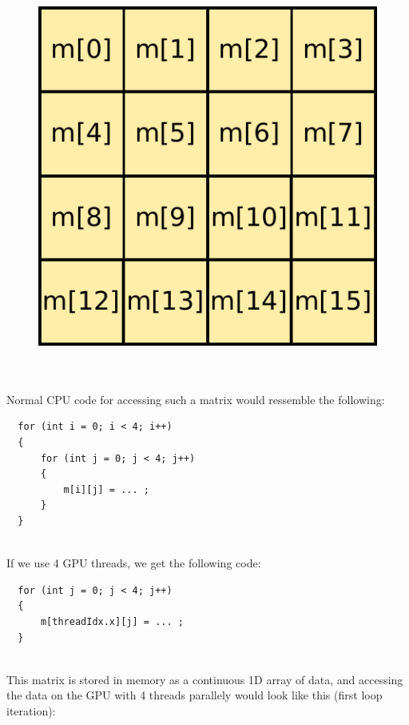 \documentclass[12pt, a4paper]{report}
\begin{document}
\begin{sloppypar}
\begin{figure}[h]
\centering
\includegraphics[scale=0.50]{figs/4x4_matrix}
\label{fig:4x4_matrix}
\end{figure}

\hspace{0pt} \\ \\
Normal CPU code for accessing such a matrix would ressemble the following:
\begin{lstlisting}
  for (int i = 0; i < 4; i++)
  {
      for (int j = 0; j < 4; j++)
      {
          m[i][j] = ... ;
      }
  }
\end{lstlisting}

\hspace{0pt} \\
If we use 4 GPU threads, we get the following code:

\begin{lstlisting}
  for (int j = 0; j < 4; j++)
  {
      m[threadIdx.x][j] = ... ;
  }
\end{lstlisting}

\hspace{0pt} \\
This matrix is stored in memory as a continuous 1D array of data, and accessing
the data on the GPU with 4 threads parallely would look like this (first loop
iteration):


\end{sloppypar}
\end{document}
